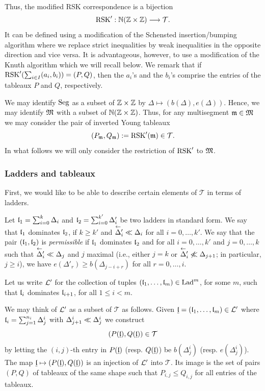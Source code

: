 \documentclass{ert-l} %
\begin{document}
Thus, the modified RSK correspondence is a bijection
\[
\operatorname{RSK}': \mathbb{N}(\mathbb{Z}\times\mathbb{Z}) \longrightarrow \mathcal{T}.
\]
It can be defined using a modification of the Schensted insertion/bumping algorithm where we replace
strict inequalities by weak inequalities in the opposite direction and vice versa.
It is advantageous, however, to use a modification of the Knuth algorithm which we will recall below.
We remark that if $\operatorname{RSK}'( \sum_{i\in I} (a_i,b_i)) = (P,Q)$, then the $a_i$'s and the $b_i$'s comprise
the entries of the tableaux $P$ and $Q$, respectively.

We may identify $\operatorname{Seg}$ as a subset of $\mathbb{Z}\times \mathbb{Z}$ by $\Delta \mapsto (b(\Delta),e(\Delta))$.
Hence, we may identify $\mathfrak{M}$ with a subset of $\mathbb{N}(\mathbb{Z}\times\mathbb{Z})$.
Thus, for any multisegment $\mathfrak{m}\in \mathfrak{M}$ we may consider the pair of inverted Young tableaux
\[
(P_{\mathfrak{m}},Q_{\mathfrak{m}}): = \operatorname{RSK}'(\mathfrak{m})\in \mathcal{T}.
\]
In what follows we will only consider the restriction of $\operatorname{RSK}'$ to $\mathfrak{M}$.

\subsubsection{Ladders and tableaux}\label{sect: lad}

First, we would like to be able to describe certain elements of $\mathcal{T}$ in terms of ladders.

Let $\mathfrak{l}_1=\sum_{i=0}^k\Delta_i$ and $\mathfrak{l}_2=\sum_{i=0}^{k'}\Delta'_i$ be two ladders in standard form.
We say that $\mathfrak{l}_1$ dominates $\mathfrak{l}_2$, if $k\ge k'$ and $\lshft\Delta'_i\smlr\Delta_i$ for all
$i=0,\dots,k'$.
We say that the pair $(\mathfrak{l}_1,\mathfrak{l}_2)$ is \emph{permissible} if $\mathfrak{l}_1$ dominates $\mathfrak{l}_2$ and
for all $i=0,\dots,k'$ and $j=0,\dots,k$
such that $\lshft\Delta'_i\smlr\Delta_j$ and $j$ maximal (i.e., either $j=k$ or $\lshft\Delta'_i\not\smlr\Delta_{j+1}$;
in particular, $j\ge i$), we have $e(\Delta'_r)\ge b(\Delta_{j-i+r})$ for all $r=0,\dots,i$.


Let us write $\mathcal{L}'$ for the collection of tuples $(\mathfrak{l}_1,\dots,\mathfrak{l}_m)\in \operatorname{Lad}^m$, for some $m$, such that $\mathfrak{l}_i$ dominates $\mathfrak{l}_{i+1}$, for all $1\leq i<m$.

We may think of $\mathcal{L}'$ as a subset of $\mathcal{T}$ as follows.
Given $\underline{\mathfrak{l}} = (\mathfrak{l}_1,\dots,\mathfrak{l}_m)\in \mathcal{L}'$
where $\mathfrak{l}_i = \sum_{j=1}^{n_i} \Delta^i_j$ with $\Delta^i_{j+1} \ll \Delta^i_j$ we construct
\[
(P(\underline{\mathfrak{l}}), Q(\underline{\mathfrak{l}}))\in \mathcal{T}
\]
by letting the $(i,j)$-th entry in $P(\underline{\mathfrak{l}})$ (resp. $Q(\underline{\mathfrak{l}})$)
be $b(\Delta^i_j)$ (resp. $e(\Delta^i_j)$).
The map $\underline{\mathfrak{l}}\mapsto (P(\underline{\mathfrak{l}}), Q(\underline{\mathfrak{l}}))$ is an injection of
$\mathcal{L}'$ into $\mathcal{T}$. Its image is the set of pairs $(P,Q)$ of tableaux of the same shape such that
$P_{i,j}\leq Q_{i,j}$ for all entries of the tableaux.
\end{document}
